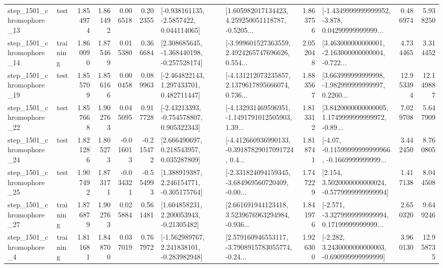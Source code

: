 \begin{tabular}{llrrrrllrlrr}
 step\_1501\_chromophore\_13 &      test &      1.854974 &    1.861492 &      0.006518 &  0.202355 &     [-0.938161135, -2.5857422, 0.044114065] &  [1.605982017134423, 4.259250051118787, -0.5205... &       1.863756 &  [-1.4349999999999952, -3.878, 0.04299999999999... &            0.486974 &          5.938250 \\
 step\_1501\_chromophore\_14 &  training &      1.860090 &    1.875469 &      0.015380 &  0.366684 &   [2.308685645, -1.368440198, -0.257528174] &  [-3.999601527363559, 2.4924265747696626, 0.554... &       2.052048 &  [3.463000000000001, -2.163000000000004, -0.722... &            4.734465 &          3.314452 \\
 step\_1501\_chromophore\_19 &      test &      1.855709 &    1.856166 &      0.000458 &  0.089963 &    [-2.464822143, 1.297433701, 0.482711447] &  [-4.131212073235857, 2.1379617895666074, 0.736... &       1.883567 &  [3.663999999999998, -1.982999999999997, 0.2260... &           12.953394 &         12.149887 \\
 step\_1501\_chromophore\_22 &      test &      1.857668 &    1.902763 &      0.045095 &  0.917728 &    [-2.43213393, -0.754578807, 0.905322343] &  [-4.132931469596951, -1.1491791012505903, 1.39... &       1.813312 &  [3.8420000000000005, 1.1749999999999972, -0.89... &            7.029708 &          5.647909 \\
 step\_1501\_chromophore\_24 &      test &      1.821286 &    1.805273 &     -0.016013 & -0.215472 &     [2.666490697, 0.218543957, 0.035287809] &  [-4.412660936990133, -0.39187829017091724, 0.4... &       1.818741 &  [-4.07, -0.11599999999999966, -0.1669999999999... &            3.442450 &          8.760805 \\
 step\_1501\_chromophore\_25 &      test &      1.907492 &    1.873171 &     -0.034321 & -0.554993 &    [1.388919387, 2.246154771, -0.305175764] &  [-2.331824094159345, -3.684969560720409, -0.00... &       1.747229 &   [2.154, 3.5020000000000024, -0.5779999999999994] &            1.417138 &          8.044508 \\
 step\_1501\_chromophore\_27 &  training &      1.876879 &    1.902763 &      0.025884 &  0.561481 &     [1.604858231, 2.200053943, -0.21305482] &  [2.661691944123418, 3.5239676963294984, -0.936... &       1.841976 &  [-2.571, -3.3279999999999994, 0.17199999999999... &            2.650320 &          9.649246 \\
  step\_1501\_chromophore\_4 &  training &      1.811681 &    1.848700 &      0.037019 &  0.767972 &   [-1.562989767, 2.241838101, -0.283982948] &  [2.579160946553117, -3.7908915783055774, -0.24... &       1.926300 &   [-2.282, 3.2430000000000003, -0.690999999999999] &            3.960130 &         12.958735 \\

\end{tabular}
